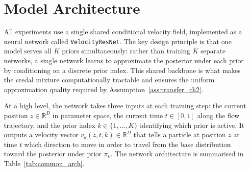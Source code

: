 \section{Model Architecture}

All experiments use a single shared 
conditional velocity field, implemented 
as a neural network called 
\texttt{VelocityResNet}. The key design 
principle is that one model serves all 
$K$ priors simultaneously: rather than 
training $K$ separate networks, a single 
network learns to approximate the 
posterior under each prior by conditioning 
on a discrete prior index. This shared 
backbone is what makes the credal mixture 
computationally tractable and ensures 
the uniform approximation quality required 
by Assumption~\ref{ass:transfer_ch2}.

At a high level, the network takes three 
inputs at each training step: the current 
position $z \in \mathbb{R}^D$ in parameter 
space, the current time $t \in [0,1]$ 
along the flow trajectory, and the prior 
index $k \in \{1, \ldots, K\}$ identifying 
which prior is active. It outputs a 
velocity vector $v_\theta(z, t, k) \in 
\mathbb{R}^D$ that tells a particle at 
position $z$ at time $t$ which direction 
to move in order to travel from the base 
distribution toward the posterior under 
prior $\pi_k$. The network architecture 
is summarised in Table~\ref{tab:common_arch}.

